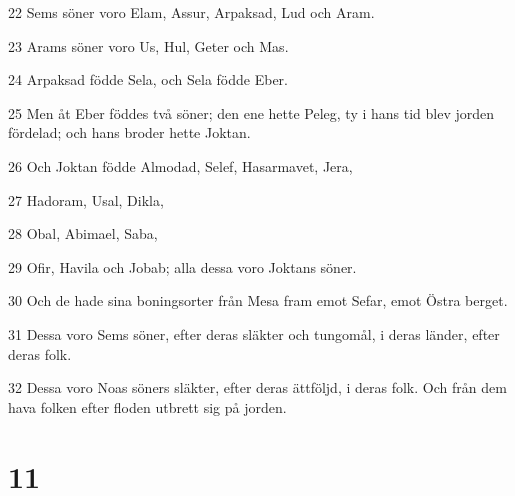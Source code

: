 \par 22 Sems söner voro Elam, Assur, Arpaksad, Lud och Aram.
\par 23 Arams söner voro Us, Hul, Geter och Mas.
\par 24 Arpaksad födde Sela, och Sela födde Eber.
\par 25 Men åt Eber föddes två söner; den ene hette Peleg, ty i hans tid blev jorden fördelad; och hans broder hette Joktan.
\par 26 Och Joktan födde Almodad, Selef, Hasarmavet, Jera,
\par 27 Hadoram, Usal, Dikla,
\par 28 Obal, Abimael, Saba,
\par 29 Ofir, Havila och Jobab; alla dessa voro Joktans söner.
\par 30 Och de hade sina boningsorter från Mesa fram emot Sefar, emot Östra berget.
\par 31 Dessa voro Sems söner, efter deras släkter och tungomål, i deras länder, efter deras folk.
\par 32 Dessa voro Noas söners släkter, efter deras ättföljd, i deras folk. Och från dem hava folken efter floden utbrett sig på jorden.

\chapter{11}

